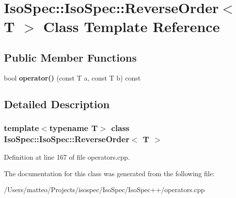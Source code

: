 \hypertarget{class_iso_spec_1_1_iso_spec_1_1_reverse_order}{}\section{Iso\+Spec\+:\+:Iso\+Spec\+:\+:Reverse\+Order$<$ T $>$ Class Template Reference}
\label{class_iso_spec_1_1_iso_spec_1_1_reverse_order}
\subsection*{Public Member Functions}
\begin{DoxyCompactItemize}
\item 
\mbox{\label{class_iso_spec_1_1_iso_spec_1_1_reverse_order_a39761f0beb165c285ed1ed4b494e35a4}} 
bool {\bfseries operator()} (const T a, const T b) const
\end{DoxyCompactItemize}


\subsection{Detailed Description}
\subsubsection*{template$<$typename T$>$\newline
class Iso\+Spec\+::\+Iso\+Spec\+::\+Reverse\+Order$<$ T $>$}



Definition at line 167 of file operators.\+cpp.



The documentation for this class was generated from the following file\+:\begin{DoxyCompactItemize}
\item 
/\+Users/matteo/\+Projects/isospec/\+Iso\+Spec/\+Iso\+Spec++/operators.\+cpp\end{DoxyCompactItemize}
